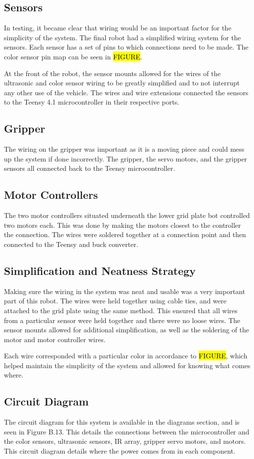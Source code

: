 \documentclass[11pt]{report}
\begin{document}
\subsection{Sensors}
In testing, it became clear that wiring would be an important factor for the simplicity of the system. The final robot had a simplified wiring system for the sensors. Each sensor has a set of pins to which connections need to be made. The color sensor pin map can be seen in \hl{FIGURE}. 
\par At the front of the robot, the sensor mounts allowed for the wires of the ultrasonic and color sensor wiring to be greatly simplified and to not interrupt any other use of the vehicle. The wires and wire extensions connected the sensors to the Teensy 4.1 microcontroller in their respective ports.
\subsection{Gripper}
The wiring on the gripper was important as it is a moving piece and could mess up the system if done incorrectly. The gripper, the servo motors, and the gripper sensors all connected back to the Teensy microcontroller. 
\subsection{Motor Controllers}
The two motor controllers situated underneath the lower grid plate bot controlled two motors each. This was done by making the motors closest to the controller the connection. The wires were soldered together at a connection point and then connected to the Teensy and buck converter. 
\subsection{Simplification and Neatness Strategy}
Making sure the wiring in the system was neat and usable was a very important part of this robot. The wires were held together using cable ties, and were attached to the grid plate using the same method. This ensured that all wires from a particular sensor were held together and there were no loose wires. The sensor mounts allowed for additional simplification, as well as the soldering of the motor and motor controller wires. 
\par Each wire corresponded with a particular color in accordance to \hl{FIGURE}, which helped maintain the simplicity of the system and allowed for knowing what comes where. 
\subsection{Circuit Diagram}
The circuit diagram for this system is available in the diagrams section, and is seen in Figure B.13. This details the connections between the microcontroller and the color sensors, ultrasonic sensors, IR array, gripper servo motors, and motors. This circuit diagram details where the power comes from in each component. 
\end{document}
